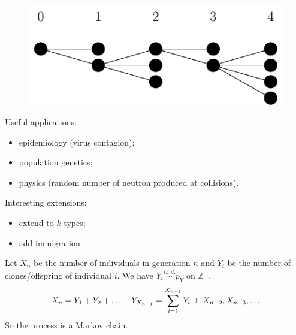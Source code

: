 \documentclass{article}
\begin{document}
\begin{figure}[H]
    \centering
    \includegraphics{standalones/pdfs/bp}
    \label{generatons}
\end{figure}
Useful applications:
\begin{itemize}
    \item epidemiology (virus contagion);
    \item population genetics;
    \item physics (random number of neutron produced at collisions).
\end{itemize}
Interesting extensions:
\begin{itemize}
    \item extend to $k$ types;
    \item add immigration.
\end{itemize}
Let $X_n$ be the number of individuals in generation $n$ and $Y_i$ be the number of clones/offspring of individual $i$. We have $Y_i \stackrel{i.i.d.}{\sim} p_Y$ on $\mathbb{Z}_+$.
\[
X_n=Y_1+Y_2+\ldots+Y_{X_{n-1}}=\sum_{i=1}^{X_{n-1}}Y_i\independent X_{n-2},X_{n-3},\ldots
\]
So the process is a Markov chain. 
\end{document}
